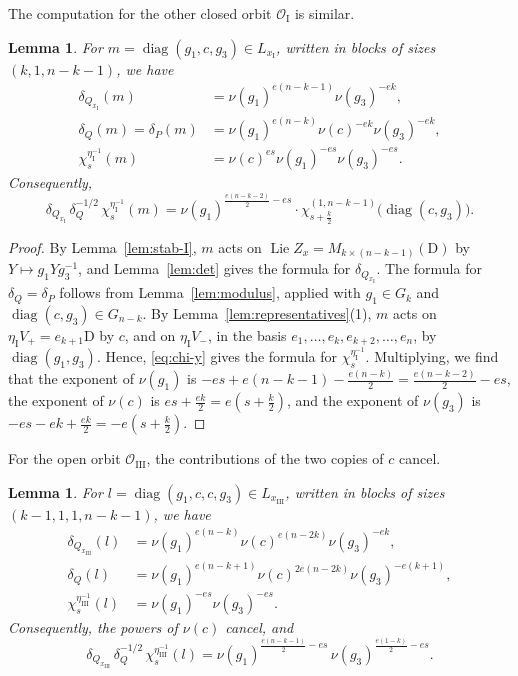 \documentclass[11pt]{amsart}
\numberwithin{equation}{section}
\theoremstyle{plain}
\newtheorem{lemma}[theorem]{Lemma}
\theoremstyle{definition}
\theoremstyle{remark}
\DeclareMathOperator{\Lie}{Lie}
\DeclareMathOperator{\diag}{diag}
\newcommand{\OI}{\mathcal{O}_{\mathrm{I}}}
\newcommand{\OIII}{\mathcal{O}_{\mathrm{III}}}
\begin{document}
The computation for the other closed orbit $\OI$ is similar.

\begin{lemma}\label{lem:char-I}
	For $m=\diag(g_1,c,g_3)\in L_{x_{\mathrm I}}$, written in blocks of sizes $(k,1,n-k-1)$, we have
	\begin{align*}
		\delta_{Q_{x_{\mathrm I}}}(m)&=\nu(g_1)^{e(n-k-1)}\nu(g_3)^{-ek},\\
		\delta_Q(m)=\delta_P(m)&=\nu(g_1)^{e(n-k)}\nu(c)^{-ek}\nu(g_3)^{-ek},\\
		\chi_s^{\eta_{\mathrm I}^{-1}}(m)&=\nu(c)^{es}\nu(g_1)^{-es}\nu(g_3)^{-es}.
	\end{align*}
	Consequently,
	$$
	\delta_{Q_{x_{\mathrm I}}}\,\delta_Q^{-1/2}\,\chi_s^{\eta_{\mathrm I}^{-1}}(m)=\nu(g_1)^{\frac{e(n-k-2)}2-es}\cdot\chi^{(1,n-k-1)}_{s+\frac k2}\big(\diag(c,g_3)\big).
	$$
\end{lemma}

\begin{proof}
	By Lemma~\ref{lem:stab-I}, $m$ acts on $\Lie Z_x=M_{k\times(n-k-1)}(\mathrm{D})$ by $Y\mapsto g_1Yg_3^{-1}$, and Lemma~\ref{lem:det} gives the formula for $\delta_{Q_{x_{\mathrm I}}}$. The formula for $\delta_Q=\delta_P$ follows from Lemma~\ref{lem:modulus}, applied with $g_1\in G_k$ and $\diag(c,g_3)\in G_{n-k}$. By Lemma~\ref{lem:representatives}(1), $m$ acts on $\eta_{\mathrm I}V_+=e_{k+1}\mathrm{D}$ by $c$, and on $\eta_{\mathrm I}V_-$, in the basis $e_1,\dots,e_k,e_{k+2},\dots,e_n$, by $\diag(g_1,g_3)$. Hence, \eqref{eq:chi-y} gives the formula for $\chi_s^{\eta_{\mathrm I}^{-1}}$. Multiplying, we find that the exponent of $\nu(g_1)$ is $-es+e(n-k-1)-\frac{e(n-k)}2=\frac{e(n-k-2)}2-es$, the exponent of $\nu(c)$ is $es+\frac{ek}2=e(s+\frac k2)$, and the exponent of $\nu(g_3)$ is $-es-ek+\frac{ek}2=-e(s+\frac k2)$.
\end{proof}

For the open orbit $\OIII$, the contributions of the two copies of $c$ cancel.

\begin{lemma}\label{lem:char-III}
	For $l=\diag(g_1,c,c,g_3)\in L_{x_{\mathrm{III}}}$, written in blocks of sizes $(k-1,1,1,n-k-1)$, we have
	\begin{align*}
		\delta_{Q_{x_{\mathrm{III}}}}(l)&=\nu(g_1)^{e(n-k)}\nu(c)^{e(n-2k)}\nu(g_3)^{-ek},\\
		\delta_Q(l)&=\nu(g_1)^{e(n-k+1)}\nu(c)^{2e(n-2k)}\nu(g_3)^{-e(k+1)},\\
		\chi_s^{\eta_{\mathrm{III}}^{-1}}(l)&=\nu(g_1)^{-es}\nu(g_3)^{-es}.
	\end{align*}
	Consequently, the powers of $\nu(c)$ cancel, and
	$$
	\delta_{Q_{x_{\mathrm{III}}}}\,\delta_Q^{-1/2}\,\chi_s^{\eta_{\mathrm{III}}^{-1}}(l)=\nu(g_1)^{\frac{e(n-k-1)}2-es}\,\nu(g_3)^{\frac{e(1-k)}2-es}.
	$$
\end{lemma}
\end{document}
